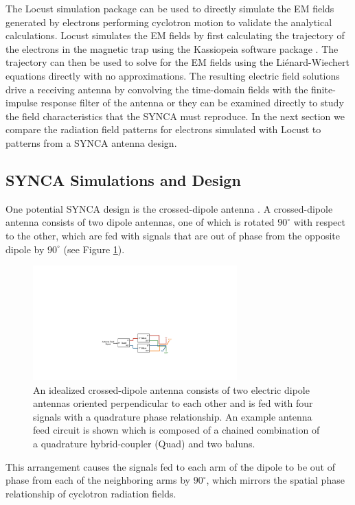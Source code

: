 The Locust simulation package \cite{Ashtari_Esfahani_2019} can be used to directly simulate the EM fields generated by electrons performing cyclotron motion to validate the analytical calculations. Locust simulates the EM fields by first calculating the trajectory of the electrons in the magnetic trap using the Kassiopeia software package \cite{Furse_2017}. The trajectory can then be used to solve for the EM fields using the Li\'{e}nard-Wiechert equations directly with no approximations. The resulting electric field solutions drive a receiving antenna by convolving the time-domain fields with the finite-impulse response filter of the antenna or they can be examined directly to study the field characteristics that the SYNCA must reproduce. In the next section we compare the radiation field patterns for electrons simulated with Locust to patterns from a SYNCA antenna design.

\subsection{SYNCA Simulations and Design}
\label{sec:synca_design}
One potential SYNCA design is the crossed-dipole antenna \cite{balanis2011modern}. A crossed-dipole antenna consists of two dipole antennas, one of which is rotated $90^\circ$ with respect to the other, which are fed with signals that are out of phase from the opposite dipole by $90^\circ$ (see Figure \ref{fig:cross-dipole}). 
\begin{figure}[h]
    \centering
    \includegraphics[width=0.7\textwidth]{figs/Chapter-5/220727_quad_balun_chain.pdf}
    \caption{\label{fig:cross-dipole} An idealized crossed-dipole antenna consists of two electric dipole antennas oriented perpendicular to each other and is fed with four signals with a quadrature phase relationship. An example antenna feed circuit is shown which is composed of a chained combination of a quadrature hybrid-coupler (Quad) and two baluns. }
\end{figure}
This arrangement causes the signals fed to each arm of the dipole to be out of phase from each of the neighboring arms by $90^\circ$, which mirrors the spatial phase relationship of cyclotron radiation fields.

